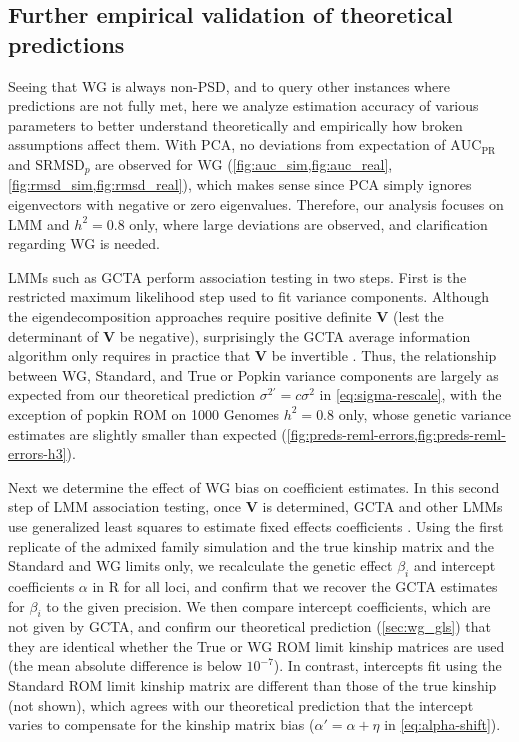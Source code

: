 \documentclass[11pt]{article}
\newcommand{\rmsd}{\text{SRMSD}_p}
\newcommand{\auc}{\text{AUC}_\text{PR}}
\begin{document}
\begin{linenumbers}
\subsection{Further empirical validation of theoretical predictions}

Seeing that WG is always non-PSD, and to query other instances where predictions are not fully met, here we analyze estimation accuracy of various parameters to better understand theoretically and empirically how broken assumptions affect them.
With PCA, no deviations from expectation of $\auc$ and $\rmsd$ are observed for WG (\cref{fig:auc_sim,fig:auc_real}, \cref{fig:rmsd_sim,fig:rmsd_real}), which makes sense since PCA simply ignores eigenvectors with negative or zero eigenvalues.
Therefore, our analysis focuses on LMM and $h^2=0.8$ only, where large deviations are observed, and clarification regarding WG is needed.

LMMs such as GCTA perform association testing in two steps.
First is the restricted maximum likelihood step used to fit variance components.
Although the eigendecomposition approaches \citep{kang_efficient_2008, lippert_fast_2011, svishcheva_rapid_2012, zhou_genome-wide_2012, sul_population_2018} require positive definite $\mathbf{V}$ (lest the determinant of $\mathbf{V}$ be negative), surprisingly the GCTA average information algorithm only requires in practice that $\mathbf{V}$ be invertible \citep{yang_gcta:_2011}.
Thus, the relationship between WG, Standard, and True or Popkin variance components are largely as expected from our theoretical prediction $\sigma^{2\prime} = c \sigma^2$ in \cref{eq:sigma-rescale}, with the exception of popkin ROM on 1000 Genomes $h^2=0.8$ only, whose genetic variance estimates are slightly smaller than expected (\cref{fig:preds-reml-errors,fig:preds-reml-errors-h3}).

Next we determine the effect of WG bias on coefficient estimates.
In this second step of LMM association testing, once $\mathbf{V}$ is determined, GCTA and other LMMs use generalized least squares to estimate fixed effects coefficients \citep{kang_efficient_2008, kang_variance_2010, yang_advantages_2014}.
Using the first replicate of the admixed family simulation and the true kinship matrix and the Standard and WG limits only, we recalculate the genetic effect $\beta_i$ and intercept coefficients $\alpha$ in R for all loci, and confirm that we recover the GCTA estimates for $\beta_i$ to the given precision.
We then compare intercept coefficients, which are not given by GCTA, and confirm our theoretical prediction (\cref{sec:wg_gls}) that they are identical whether the True or WG ROM limit kinship matrices are used (the mean absolute difference is below $10^{-7}$).
In contrast, intercepts fit using the Standard ROM limit kinship matrix are different than those of the true kinship (not shown), which agrees with our theoretical prediction that the intercept varies to compensate for the kinship matrix bias ($\alpha' = \alpha + \eta$ in \cref{eq:alpha-shift}).


\end{linenumbers}
\end{document}
